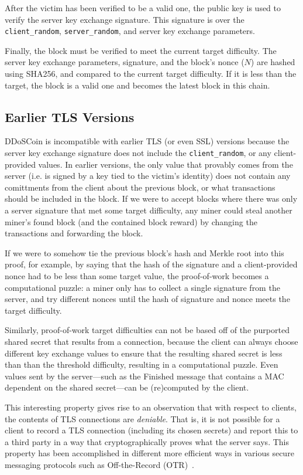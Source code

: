 After the victim has been verified to be a valid one, the public key is used to
verify the server key exchange signature. This signature is over the
\texttt{client\_random}, \texttt{server\_random}, and server key exchange
parameters.

Finally, the block must be verified to meet the current target difficulty. The
server key exchange parameters, signature, and the block's nonce ($N$) are
hashed using SHA256, and compared to the current target difficulty. If it is
less than the target, the block is a valid one and becomes the latest block in
this chain.

\subsection{Earlier TLS Versions}

DDoSCoin is incompatible with earlier TLS (or even SSL) versions because the
server key exchange signature does not include the \texttt{client\_random}, or
any client-provided values. In earlier versions, the only value that provably comes from the server (i.e.
is signed by a key tied to the victim's identity) does not contain any
comittments from the client about the previous block, or what transactions
should be included in the block. If we were to accept blocks where there was
only a server signature that met some target difficulty, any miner could steal
another miner's found block (and the contained block reward) by changing the
transactions and forwarding the block.

If we were to somehow tie the previous block's hash and Merkle root into this
proof, for example, by saying that the hash of the signature and a
client-provided nonce had to be less than some target value, the proof-of-work becomes
a computational puzzle: a miner only has to collect a single signature from
the server, and try different nonces until the hash of signature and nonce meets
the target difficulty.

Similarly, proof-of-work target difficulties can not be based off of the
purported shared secret that results from a connection, because the client can
always choose different key exchange values to ensure that the resulting shared
secret is less than than the threshold difficulty, resulting in a computational
puzzle. Even values sent by the server---such as the Finished message that
contains a MAC dependent on the shared secret---can be (re)computed by the client.

This interesting property gives rise to an observation that with respect to
clients, the contents of TLS connections are \emph{deniable}. That is, it is not
possible for a client to record a TLS connection (including its chosen secrets)
and report this to a third party in a way that cryptographically proves what the
server says. This property has been accomplished in different more efficient ways in various
secure messaging protocols such as Off-the-Record (OTR)~\cite{otr}.

